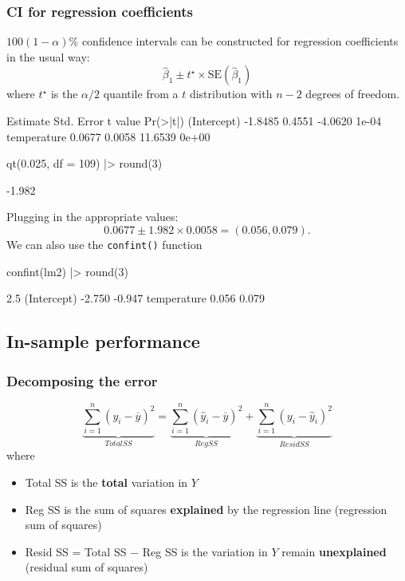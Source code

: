\documentclass[a4paper]{article}\usepackage[]{graphicx}\usepackage[]{xcolor}
\begin{document}
\subsubsection{CI for regression coefficients}
\( 100(1-\alpha)\% \) confidence intervals can be constructed for regression coefficients in the usual way:
\[
	\hat{\beta}_1 \pm t^\star \times \text{SE}(\hat{\beta}_1)
\]
where \( t^\star \) is the \( \alpha / 2 \) quantile from a \( t \) distribution with \( n-2 \) degrees of freedom.
\begin{Schunk}
\begin{Soutput}
            Estimate Std. Error t value Pr(>|t|)
(Intercept)  -1.8485     0.4551 -4.0620    1e-04
temperature   0.0677     0.0058 11.6539    0e+00
\end{Soutput}
\begin{Sinput}
qt(0.025, df = 109) |> round(3)
\end{Sinput}
\begin{Soutput}
[1] -1.982
\end{Soutput}
\end{Schunk}
Plugging in the appropriate values:
\[
	0.0677 \pm 1.982 \times 0.0058 = (0.056, 0.079).
\]
We can also use the \lstinline|confint()| function
\begin{Schunk}
\begin{Sinput}
confint(lm2) |> round(3)
\end{Sinput}
\begin{Soutput}
             2.5 %
(Intercept) -2.750 -0.947
temperature  0.056  0.079
\end{Soutput}
\end{Schunk}
\subsection{In-sample performance}
\subsubsection{Decomposing the error}
\[
	\underbrace{\sum_{i=1}^n(y_i-\overline y)^2}_{{Total SS}} = \underbrace{\sum_{i=1}^n(\hat y_i-\overline y)^2}_{{Reg SS}} + \underbrace{\sum_{i=1}^n (y_i-\hat y_i)^2}_{{Resid SS}}
\]
where
\begin{itemize}
	\item Total SS is the \textbf{total} variation in \( Y \) 
	\item Reg SS is the sum of squares \textbf{explained} by the regression line (regression sum of squares)
	\item Resid SS = Total SS \( - \) Reg SS is the variation in \( Y \) remain \textbf{unexplained} (residual sum of squares)
\end{itemize}
\end{document}
